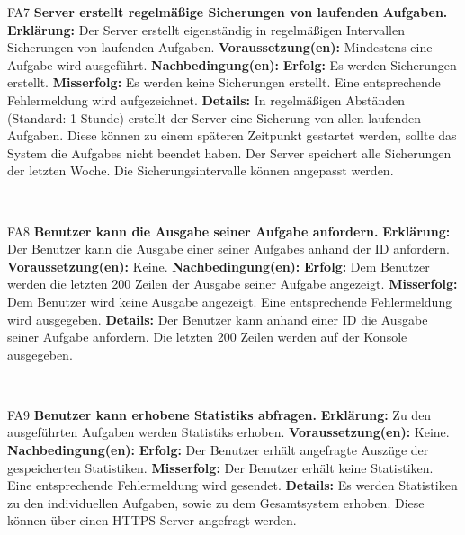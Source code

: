 \documentclass[a4paper,12pt]{article}
\begin{document}
\begin{itemize}[nosep]
	\begin{minipage}[t]{\linewidth}
		\item[FA7] \textbf{\gls{Server} erstellt regelmäßige Sicherungen von laufenden Aufgaben.}
		\subitem \textbf{Erklärung:} Der \gls{Server} erstellt eigenständig in regelmäßigen Intervallen Sicherungen von laufenden Aufgaben.
		\subitem \textbf{Voraussetzung(en):} Mindestens eine Aufgabe wird ausgeführt.
		\subitem \textbf{Nachbedingung(en):}
		\subsubitem \textbf{Erfolg:} Es werden Sicherungen erstellt.
		\subsubitem \textbf{Misserfolg:} Es werden keine Sicherungen erstellt. Eine entsprechende Fehlermeldung wird aufgezeichnet.
		\subitem \textbf{Details:} In regelmäßigen Abständen (Standard: 1 Stunde) erstellt der Server eine Sicherung von allen laufenden Aufgaben. Diese können zu einem späteren Zeitpunkt gestartet werden, sollte das System die \glspl{Aufgabe} nicht beendet haben. Der Server speichert alle Sicherungen der letzten Woche. Die Sicherungsintervalle können angepasst werden.
	\end{minipage}	
	\newline
	\\
	
	\begin{minipage}[t]{\linewidth}
		\item[FA8] \textbf{\gls{Benutzer} kann die Ausgabe seiner Aufgabe anfordern.}
		\subitem \textbf{Erklärung:} Der \gls{Benutzer} kann die Ausgabe einer seiner \glspl{Aufgabe} anhand der ID anfordern.
		\subitem \textbf{Voraussetzung(en):} Keine.
		\subitem \textbf{Nachbedingung(en):}
		\subsubitem \textbf{Erfolg:} Dem Benutzer werden die letzten 200 Zeilen der Ausgabe seiner Aufgabe angezeigt.
		\subsubitem \textbf{Misserfolg:} Dem Benutzer wird keine Ausgabe angezeigt. Eine entsprechende Fehlermeldung wird ausgegeben.
		\subitem \textbf{Details:} Der \gls{Benutzer} kann anhand einer ID die Ausgabe seiner Aufgabe anfordern. Die letzten 200 Zeilen werden auf der Konsole ausgegeben.
	\end{minipage}	
	\newline
	\\
	
	\begin{minipage}[t]{\linewidth}
	\item[FA9] \textbf{\gls{Benutzer} kann erhobene \glspl{Statistik} abfragen.}
	\subitem \textbf{Erklärung:} Zu den ausgeführten Aufgaben werden \glspl{Statistik} erhoben.
	\subitem \textbf{Voraussetzung(en):} Keine.
	\subitem \textbf{Nachbedingung(en):}
	\subsubitem \textbf{Erfolg:} Der Benutzer erhält angefragte Auszüge der gespeicherten Statistiken.
	\subsubitem \textbf{Misserfolg:} Der Benutzer erhält keine Statistiken. Eine entsprechende Fehlermeldung wird gesendet.
	\subitem \textbf{Details:} Es werden Statistiken zu den individuellen Aufgaben, sowie zu dem Gesamtsystem erhoben. Diese können über einen HTTPS-Server angefragt werden.
\end{minipage}	
\newline
\\	
	
\end{itemize}
\end{document}
